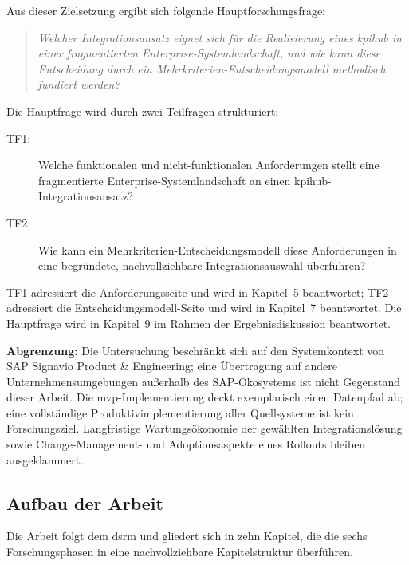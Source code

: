 Aus dieser Zielsetzung ergibt sich folgende Hauptforschungsfrage:

\begin{quote}
\textit{Welcher Integrationsansatz eignet sich für die Realisierung eines \gls{kpihub} in einer fragmentierten Enterprise-Systemlandschaft, und wie kann diese Entscheidung durch ein Mehrkriterien-Entscheidungsmodell methodisch fundiert werden?}
\end{quote}

Die Hauptfrage wird durch zwei Teilfragen strukturiert:

\begin{description}
    \item[TF1:] Welche funktionalen und nicht-funktionalen Anforderungen stellt eine fragmentierte Enterprise-Systemlandschaft an einen \gls{kpihub}-Integrationsansatz?
    \item[TF2:] Wie kann ein Mehrkriterien-Entscheidungsmodell diese Anforderungen in eine begründete, nachvollziehbare Integrationsauswahl überführen?
\end{description}

TF1 adressiert die Anforderungsseite und wird in Kapitel~5 beantwortet; TF2 adressiert die Entscheidungsmodell-Seite und wird in Kapitel~7 beantwortet.
Die Hauptfrage wird in Kapitel~9 im Rahmen der Ergebnisdiskussion beantwortet.

\textbf{Abgrenzung:} Die Untersuchung beschränkt sich auf den Systemkontext von SAP Signavio Product \& Engineering; eine Übertragung auf andere Unternehmensumgebungen außerhalb des SAP-Ökosystems ist nicht Gegenstand dieser Arbeit.
Die \gls{mvp}-Implementierung deckt exemplarisch einen Datenpfad ab; eine vollständige Produktivimplementierung aller Quellsysteme ist kein Forschungsziel.
Langfristige Wartungsökonomie der gewählten Integrationslösung sowie Change-Management- und Adoptionsaspekte eines Rollouts bleiben ausgeklammert.


\subsection{Aufbau der Arbeit}
\label{sec:einleitung-aufbau}

Die Arbeit folgt dem \gls{dsrm} und gliedert sich in zehn Kapitel, die die sechs Forschungsphasen in eine nachvollziehbare Kapitelstruktur überführen.

